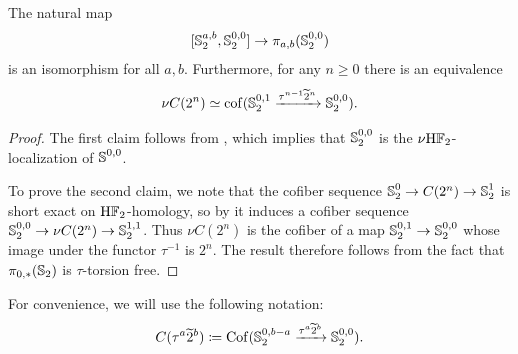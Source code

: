 \begin{lem} \label{fact:2-complete-fine}
    The natural map \[ [\operatorname{\mathbb{S}}_2^{a,b}, \operatorname{\mathbb{S}}_2 ^{0,0}] \to \pi_{a,b} (\operatorname{\mathbb{S}}_2 ^{0,0})\] is an isomorphism for all $a,b$.
  Furthermore, for any $n \geq 0$ there is an equivalence
    \[\nu C(2^n) \simeq \mathrm{cof}(\Ss_2^{0,1} \xrightarrow{\tau^{n-1} \wt{2}^n} \Ss_2^{0,0}). \]
\end{lem}

\begin{proof}
  The first claim follows from \cite[Proposition 5.6]{Pstragowski}, which implies that $\operatorname{\mathbb{S}}^{0,0} _2$ is the $\nu \mathrm{H}\mathbb{F}_2$-localization of $\operatorname{\mathbb{S}}^{0,0}$. 

  To prove the second claim, we note that the cofiber sequence $ \operatorname{\mathbb{S}}_2^0 \to C(2^n) \to \operatorname{\mathbb{S}}_2^1 $
    is short exact on $\mathrm{H}\mathbb{F}_2$-homology, so by  it induces a cofiber sequence $\operatorname{\mathbb{S}}_2 ^{0,0} \to \nu C(2^n) \to \operatorname{\mathbb{S}}_2 ^{1,1}$.
    Thus $\nu C(2^n)$ is the cofiber of a map $\operatorname{\mathbb{S}}_2 ^{0,1} \to \operatorname{\mathbb{S}}_2 ^{0,0}$ whose image under the functor $\tau^{-1}$ is $2^n$.
    The result therefore follows from the fact that $\pi_{0,*} (\operatorname{\mathbb{S}}_2)$ is $\tau$-torsion free.
\end{proof}

\begin{ntn}
  For convenience, we will use the following notation:
  $$ C(\tau^a \wt{2}^b) \coloneqq \mathrm{Cof}(\Ss_2^{0,b-a} \xrightarrow{\tau^a \wt{2}^b} \Ss_2^{0,0}). $$
\end{ntn}






